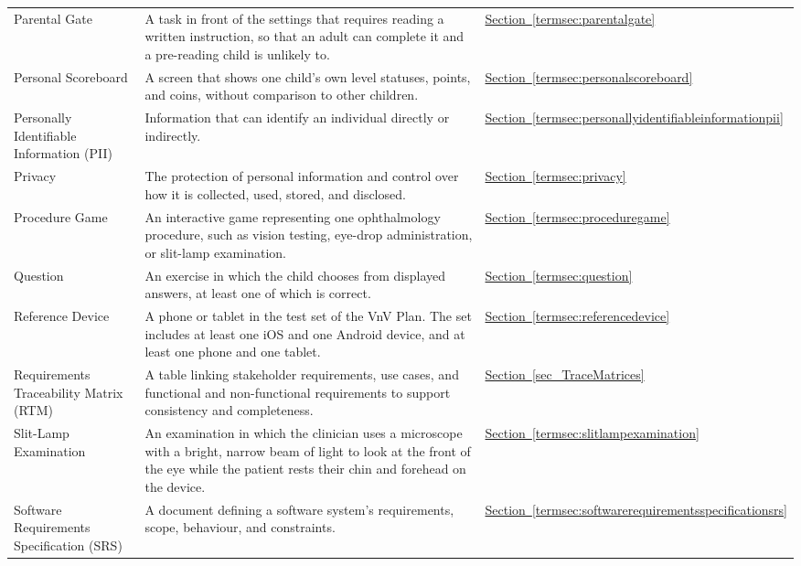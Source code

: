 \documentclass[10pt]{article}
\newcommand{\termloc}[1]{\hyperlink{term:#1}{Section~\ref*{termsec:#1}}}
\newcommand{\termlocref}[1]{\hyperref[#1]{Section~\ref*{#1}}}
\begin{document}
\begin{longtable}{@{}p{} p{} p{}@{}}
Parental Gate &
A task in front of the settings that requires reading a written instruction, so that an adult can complete it and a pre-reading child is unlikely to. &
\termloc{parentalgate} \\

Personal Scoreboard &
A screen that shows one child's own level statuses, points, and coins, without comparison to other children. &
\termloc{personalscoreboard} \\

Personally Identifiable Information (PII) &
Information that can identify an individual directly or indirectly. &
\termloc{personallyidentifiableinformationpii} \\

Privacy &
The protection of personal information and control over how it is collected, used, stored, and disclosed. &
\termloc{privacy} \\

Procedure Game &
An interactive game representing one ophthalmology procedure, such as vision testing, eye-drop administration, or slit-lamp examination. &
\termloc{proceduregame} \\

Question &
An exercise in which the child chooses from displayed answers, at least one of which is correct. &
\termloc{question} \\

Reference Device &
A phone or tablet in the test set of the VnV Plan. The set includes at least one iOS and one Android device, and at least one phone and one tablet. &
\termloc{referencedevice} \\

Requirements Traceability Matrix (RTM) &
A table linking stakeholder requirements, use cases, and functional and non-functional requirements to support consistency and completeness. &
\termlocref{sec_TraceMatrices} \\

Slit-Lamp Examination &
An examination in which the clinician uses a microscope with a bright, narrow beam of light to look at the front of the eye while the patient rests their chin and forehead on the device. &
\termloc{slitlampexamination} \\

Software Requirements Specification (SRS) &
A document defining a software system's requirements, scope, behaviour, and constraints. &
\termloc{softwarerequirementsspecificationsrs} \\


\end{longtable}
\end{document}
